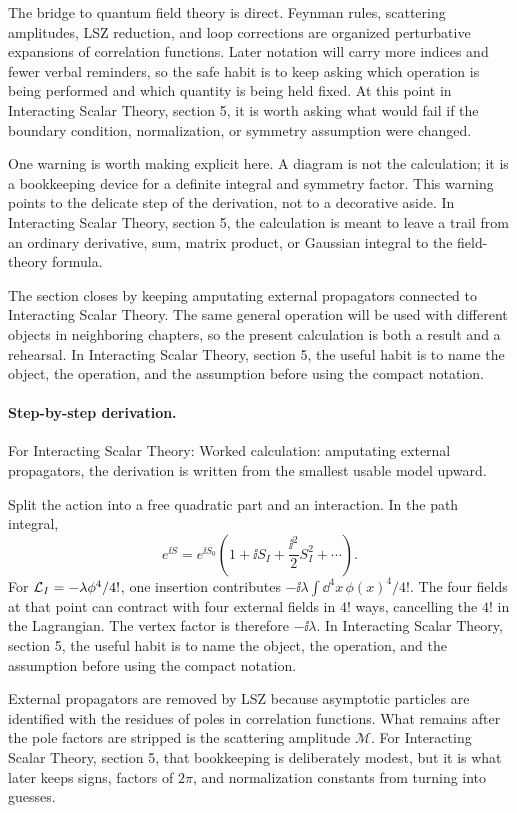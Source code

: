 The bridge to quantum field theory is direct.  Feynman rules, scattering amplitudes, LSZ reduction, and loop corrections are organized perturbative expansions of correlation functions.  Later notation will carry more indices and fewer verbal reminders, so the safe habit is to keep asking which operation is being performed and which quantity is being held fixed.  At this point in Interacting Scalar Theory, section 5, it is worth asking what would fail if the boundary condition, normalization, or symmetry assumption were changed.

One warning is worth making explicit here.  A diagram is not the calculation; it is a bookkeeping device for a definite integral and symmetry factor.  This warning points to the delicate step of the derivation, not to a decorative aside.  In Interacting Scalar Theory, section 5, the calculation is meant to leave a trail from an ordinary derivative, sum, matrix product, or Gaussian integral to the field-theory formula.

The section closes by keeping amputating external propagators connected to Interacting Scalar Theory.  The same general operation will be used with different objects in neighboring chapters, so the present calculation is both a result and a rehearsal.  In Interacting Scalar Theory, section 5, the useful habit is to name the object, the operation, and the assumption before using the compact notation.



\paragraph{Step-by-step derivation.}

For Interacting Scalar Theory: Worked calculation: amputating external propagators, the derivation is written from the smallest usable model upward.

Split the action into a free quadratic part and an interaction.  In the path integral,
\[
  e^{\ii S}=e^{\ii S_0}\left(1+\ii S_I+\frac{\ii^2}{2}S_I^2+\cdots\right).
\]
For \(\mathcal L_I=-\lambda\phi^4/4!\), one insertion contributes \(-\ii\lambda\int\dd^4x\,\phi(x)^4/4!\).  The four fields at that point can contract with four external fields in \(4!\) ways, cancelling the \(4!\) in the Lagrangian.  The vertex factor is therefore \(-\ii\lambda\).  In Interacting Scalar Theory, section 5, the useful habit is to name the object, the operation, and the assumption before using the compact notation.

External propagators are removed by LSZ because asymptotic particles are identified with the residues of poles in correlation functions.  What remains after the pole factors are stripped is the scattering amplitude \(\mathcal M\).  For Interacting Scalar Theory, section 5, that bookkeeping is deliberately modest, but it is what later keeps signs, factors of \(2\pi\), and normalization constants from turning into guesses.

